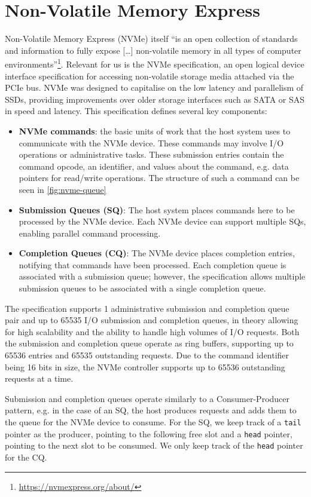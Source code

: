 \section{Non-Volatile Memory Express}
Non-Volatile Memory Express (NVMe) itself ``is an open collection of standards and information to fully expose [\ldots] non-volatile memory in all types of computer environments''\footnote{\url{https://nvmexpress.org/about/}}. Relevant for us is the NVMe specification, an open logical device interface specification for accessing non-volatile storage media attached via the PCIe bus. NVMe was designed to capitalise on the low latency and parallelism of SSDs, providing improvements over older storage interfaces such as SATA or SAS in speed and latency. This specification defines several key components:

\begin{itemize}
    \item \textbf{NVMe commands}: the basic units of work that the host system uses to communicate with the NVMe device. These commands may involve I/O operations or administrative tasks. These submission entries contain the command opcode, an identifier, and values about the command, e.g. data pointers for read/write operations. The structure of such a command can be seen in \autoref{fig:nvme-queue}
    \item \textbf{Submission Queues (SQ)}: The host system places commands here to be processed by the NVMe device. Each NVMe device can support multiple SQs, enabling parallel command processing.
    \item \textbf{Completion Queues (CQ)}: The NVMe device places completion entries, notifying that commands have been processed. Each completion queue is associated with a submission queue; however, the specification allows multiple submission queues to be associated with a single completion queue.
\end{itemize}

The specification supports 1 administrative submission and completion queue pair and up to 65535 I/O submission and completion queues, in theory allowing for high scalability and the ability to handle high volumes of I/O requests. Both the submission and completion queue operate as ring buffers, supporting up to 65536 entries and 65535 outstanding requests. Due to the command identifier being 16 bits in size, the NVMe controller supports up to 65536 outstanding requests at a time.

Submission and completion queues operate similarly to a Consumer-Producer pattern, e.g. in the case of an SQ, the host produces requests and adds them to the queue for the NVMe device to consume. For the SQ, we keep track of a \texttt{tail} pointer as the producer, pointing to the following free slot and a \texttt{head} pointer, pointing to the next slot to be consumed. We only keep track of the \texttt{head} pointer for the CQ.


